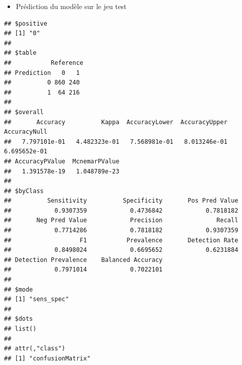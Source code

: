 \documentclass[
  12pt,
]{article}
\newenvironment{Shaded}{\begin{snugshade}}{\end{snugshade}}
\newcommand{\AttributeTok}[1]{\textcolor[rgb]{0.77,0.63,0.00}{#1}}
\newcommand{\DecValTok}[1]{\textcolor[rgb]{0.00,0.00,0.81}{#1}}
\newcommand{\FunctionTok}[1]{\textcolor[rgb]{0.00,0.00,0.00}{#1}}
\newcommand{\NormalTok}[1]{#1}
\newcommand{\OtherTok}[1]{\textcolor[rgb]{0.56,0.35,0.01}{#1}}
\newcommand{\SpecialCharTok}[1]{\textcolor[rgb]{0.00,0.00,0.00}{#1}}
\newcommand{\StringTok}[1]{\textcolor[rgb]{0.31,0.60,0.02}{#1}}
\providecommand{\tightlist}{%
  \setlength{\itemsep}{0pt}\setlength{\parskip}{0pt}}
\begin{document}
\newpage

\begin{itemize}
\tightlist
\item
  Prédiction du modèle sur le jeu test
\end{itemize}

\begin{Shaded}
\end{Shaded}

\begin{verbatim}
## $positive
## [1] "0"
## 
## $table
##           Reference
## Prediction   0   1
##          0 860 240
##          1  64 216
## 
## $overall
##       Accuracy          Kappa  AccuracyLower  AccuracyUpper   AccuracyNull 
##   7.797101e-01   4.482323e-01   7.568981e-01   8.013246e-01   6.695652e-01 
## AccuracyPValue  McnemarPValue 
##   1.391578e-19   1.048789e-23 
## 
## $byClass
##          Sensitivity          Specificity       Pos Pred Value 
##            0.9307359            0.4736842            0.7818182 
##       Neg Pred Value            Precision               Recall 
##            0.7714286            0.7818182            0.9307359 
##                   F1           Prevalence       Detection Rate 
##            0.8498024            0.6695652            0.6231884 
## Detection Prevalence    Balanced Accuracy 
##            0.7971014            0.7022101 
## 
## $mode
## [1] "sens_spec"
## 
## $dots
## list()
## 
## attr(,"class")
## [1] "confusionMatrix"
\end{verbatim}
\end{document}
